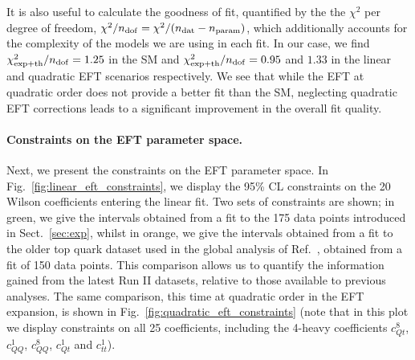 \documentclass[withindex,glossary]{cam-thesis}
\begin{document}
It is also useful to calculate the goodness of fit, quantified by the
the $\chi^2$ per degree of freedom, $\chi^2/n_{\rm dof} = \chi^2/(n_{\rm dat} - n_{\rm param})$, 
which additionally accounts for the complexity of the models we are
using in each fit. In our case, we find $\chi^2_{\rm exp+th}/n_{\rm dof} = 1.25$ in the SM and $\chi^2_{\rm exp+th}/n_{\rm dof} = 0.95$ 
and $1.33$ in the linear
and quadratic EFT scenarios respectively.  
We see that while the EFT at quadratic order does not provide a better fit than the SM, neglecting quadratic EFT corrections leads to
a significant improvement in the overall fit quality.




\paragraph{Constraints on the EFT parameter space.}
Next, we present the constraints on the EFT parameter space. In
Fig.~\ref{fig:linear_eft_constraints}, we display the 95\% CL
constraints on the 20 Wilson coefficients entering the linear fit. Two
sets of constraints are shown; in green, we give the intervals
obtained from a fit to the 175 data points introduced in
Sect.~\ref{sec:exp}, whilst in orange, we give the intervals
obtained from a fit to the older top quark dataset used in the global
analysis of Ref.~\cite{Ethier:2021bye}, obtained from a fit of 150
data points. This comparison allows us to quantify the information
gained from the latest Run II datasets, relative to those available to
previous analyses. The same comparison, this time at quadratic order in the EFT expansion,  
is shown in Fig.~\ref{fig:quadratic_eft_constraints} (note that in this plot we display constraints on 
all 25 coefficients, including the 4-heavy coefficients $c_{Qt}^{8}$, $c_{QQ}^{1}$, $c_{QQ}^{8}$, $c_{Qt}^{1}$ and $c_{tt}^{1}$).
\end{document}
